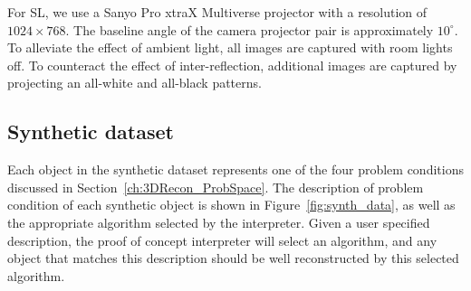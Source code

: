 For SL, we use a Sanyo Pro xtraX Multiverse projector with a resolution of $1024\times 768$. The baseline angle of the camera projector pair is approximately $10^\circ$. To alleviate the effect of ambient light, all images are captured with room lights off. To counteract the effect of inter-reflection, additional images are captured by projecting an all-white and all-black patterns.

\subsection{Synthetic dataset}
Each object in the synthetic dataset represents one of the four problem conditions discussed in Section~\ref{ch:3DRecon_ProbSpace}. The description of problem condition of each synthetic object is shown in Figure~\ref{fig:synth_data}, as well as the appropriate algorithm selected by the interpreter. Given a user specified description, the proof of concept interpreter will select an algorithm, and any object that matches this description should be well reconstructed by this selected algorithm.
